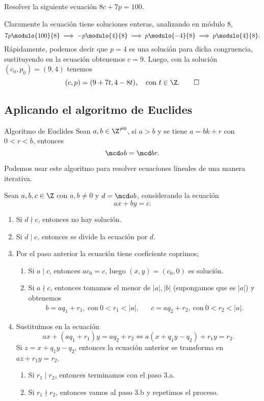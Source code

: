\begin{example}
    Resolver la siguiente ecuación $8c+7p=100$.
\end{example}
\begin{solution}
    Claramente la ecuación tiene soluciones enteras, analizando en módulo 8,
    \[
        7p \modulo{100}{8} \implies -p \modulo{4}{8} \implies p \modulo{-4}{8} \implies p \modulo{4}{8}.
    \]
    Rápidamente, podemos decir que $p = 4$ es una solución para dicha congruencia, sustituyendo en la ecuación obtenemos $c = 9$.
    Luego, con la solución $(c_0, p_0) = (9, 4)$ tenemos
    \[
        (c,p) = (9 + 7t, 4 - 8t),\quad \text{con}\ t\in \Z.\qedhere
    \]
\end{solution}



\subsection{Aplicando el algoritmo de Euclides}

\begin{definition.box}{Algoritmo de Euclides}{}
    Sean $a, b \in \Z^{\neq 0}$, si $a > b$ y se tiene $a = bk + r$ con $0 < r < b$, entonces
    \[
        \mcd a b = \mcd b r.
    \]
\end{definition.box}

Podemos usar este algoritmo para resolver ecuaciones lineales de una manera iterativa.

Sean $a,b, c \in \Z$ con $a,b \neq 0$ y $d = \mcd a b$, considerando la ecuación
\[
    ax + by = c.
\]
\begin{enumerate}
    \item Si $d\nmid c$, entonces no hay solución.
    \item Si $d \mid c$, entonces se divide la ecuación por $d$.
    \item Por el paso anterior la ecuación tiene coeficiente coprimos;
    \begin{enumerate}
        \item Si $a \mid c$, entonces $ac_0 = c$, luego $(x,y) = (c_0, 0)$ es solución.
        \item Si $a \nmid c$, entonces tomamos el menor de $|a|, |b|$ (supongamos que es $|a|$) y obtenemos
        \begin{align*}
            b = aq_1 + r_1,\ \text{con}\ 0<r_1<|a|, && c = aq_2 + r_2,\ \text{con}\ 0 < r_2 < |a|.
        \end{align*}
    \end{enumerate}
    \item Sustituimos en la ecuación
    \[
        ax + (a q_1 + r_1) y = aq_2 + r_2 \iff a(x + q_1 y -q_2) + r_1 y = r_2.
    \]
    Si $z = x + q_1 y - q_2$, entonces la ecuación anterior se transforma en $az + r_1 y = r_2$.
    \begin{enumerate}
        \item Si $r_1 \mid r_2$, entonces terminamos con el paso 3.a.
        \item Si $r_1 \nmid r_2$, entonces vamos al paso 3.b y repetimos el proceso.
    \end{enumerate}
\end{enumerate}

